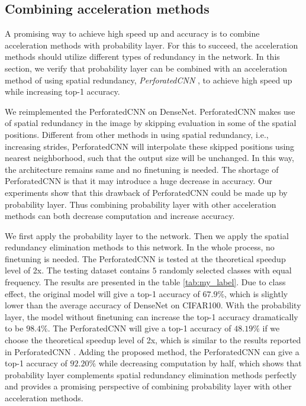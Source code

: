 \documentclass{article}
\begin{document}
\subsection{Combining acceleration methods}
A promising way to achieve high speed up and accuracy is to combine acceleration methods with probability layer. For this to succeed, the acceleration methods should utilize different types of redundancy in the network. In this section, we verify that probability layer can be combined with an acceleration method of using spatial redundancy, \textit{PerforatedCNN} \cite{figurnov2016perforatedcnns}, to achieve high speed up while increasing top-1 accuracy.

We reimplemented the PerforatedCNN \cite{figurnov2016perforatedcnns} on DenseNet. PerforatedCNN makes use of spatial redundancy in the image by skipping evaluation in some of the spatial positions. Different from other methods in using spatial redundancy, i.e., increasing strides, PerforatedCNN will interpolate these skipped positions using nearest neighborhood, such that the output size will be unchanged. In this way, the architecture remains same and no finetuning is needed. The shortage of PerforatedCNN is that it may introduce a huge decrease in accuracy. Our experiments show that this drawback of PerforatedCNN could be made up by probability layer. Thus combining probability layer with other acceleration methods can both decrease computation and increase accuracy.

We first apply the probability layer to the network. Then we apply the spatial redundancy elimination methods to this network. In the whole process, no finetuning is needed. The PerforatedCNN is tested at the theoretical speedup level of 2x. The testing dataset contains $5$ randomly selected classes with equal frequency. The results are presented in the table \ref{tab:my_label}. Due to class effect, the original model will give a top-1 accuracy of $67.9\%$, which is slightly lower than the average accuracy of DenseNet on CIFAR100. With the probability layer, the model without finetuning can increase the top-1 accuracy dramatically to be $98.4\%$. The PerforatedCNN will give a top-1 accuracy of $48.19\%$ if we choose the theoretical speedup level of 2x, which is similar to the results reported in PerforatedCNN \cite{figurnov2016perforatedcnns}. Adding the proposed method, the PerforatedCNN can give a top-1 accuracy of $92.20\%$ while decreasing computation by half, which shows that probability layer complements spatial redundancy elimination methods perfectly and provides a promising perspective of combining probability layer with other acceleration methods.
\end{document}
